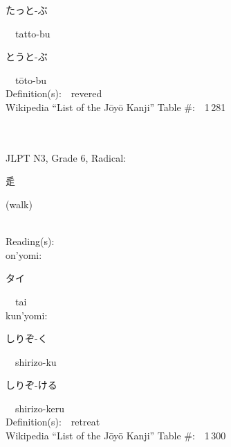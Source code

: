 \begin{multicols}{2}
{\hspace*{2em}}{\begin{CJK}{UTF8}{min} たっと-ぶ \end{CJK}}\ \ tatto-bu\ \ \\
{\hspace*{2em}}{\begin{CJK}{UTF8}{min} とうと-ぶ \end{CJK}}\ \ t\=oto-bu\ \ \\
Definition(s):\ \ revered \\
Wikipedia ``List of the J\=oy\=o Kanji'' Table \#:\ \ 1\,281 \\
\ \ \\
{\fontsize{34pt}{40pt}  }\ \ \\  %
{JLPT N3, Grade 6, Radical:\ \ {\begin{CJK}{UTF8}{min} 辵 \end{CJK}} (walk) } \\
Reading(s):\ \ \\
{\hspace*{1em}}on'yomi:\ \ \\
{\hspace*{2em}}{\begin{CJK}{UTF8}{min} タイ \end{CJK}}\ \ tai\ \ \\
{\hspace*{1em}}kun'yomi:\ \ \\
{\hspace*{2em}}{\begin{CJK}{UTF8}{min} しりぞ-く \end{CJK}}\ \ shirizo-ku\ \ \\
{\hspace*{2em}}{\begin{CJK}{UTF8}{min} しりぞ-ける \end{CJK}}\ \ shirizo-keru\ \ \\
Definition(s):\ \ retreat \\
Wikipedia ``List of the J\=oy\=o Kanji'' Table \#:\ \ 1\,300 \\
\ \ \\
{\fontsize{34pt}{40pt}  }\ \ \\  %

\end{multicols}
